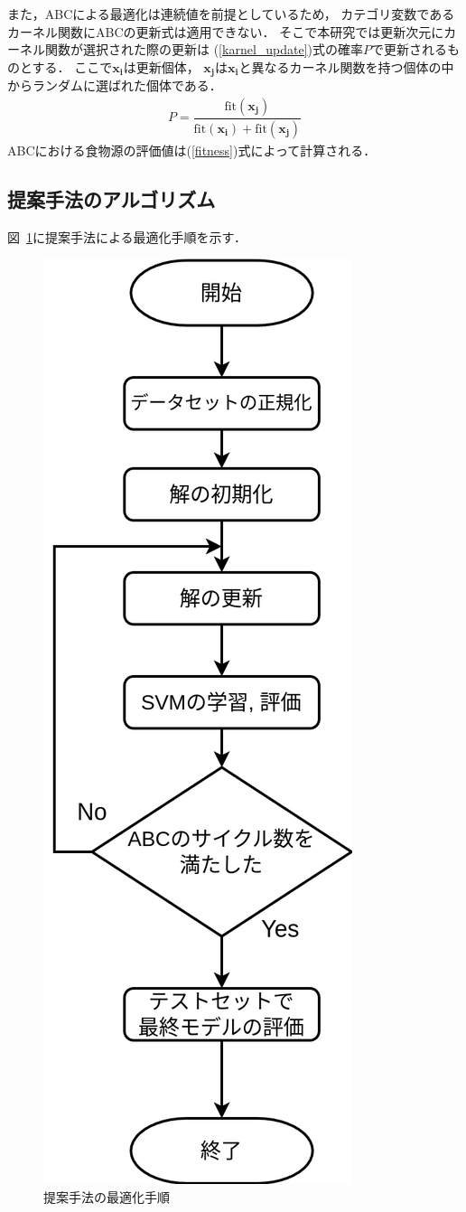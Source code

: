 また，ABCによる最適化は連続値を前提としているため，
カテゴリ変数であるカーネル関数にABCの更新式は適用できない．
そこで本研究では更新次元にカーネル関数が選択された際の更新は
(\ref{karnel_update})式の確率$P$で更新されるものとする．
ここで$\boldsymbol{x_i}$は更新個体，
$\boldsymbol{x_j}$は$\boldsymbol{x_i}$と異なるカーネル関数を持つ個体の中からランダムに選ばれた個体である．
\begin{align}
    \label{karnel_update}
   P = \dfrac{\mathrm{fit}(\boldsymbol{x_j})}{\mathrm{fit}(\boldsymbol{x_i})+\mathrm{fit}(\boldsymbol{x_j})}
\end{align}
ABCにおける食物源の評価値は(\ref{fitness})式によって計算される．
\subsection{提案手法のアルゴリズム}
図~\ref{flowchart}に提案手法による最適化手順を示す．
\begin{figure}
    \centering
    \includegraphics[width=0.4\linewidth]{flowchart.png}
    \caption{提案手法の最適化手順} 
    \label{flowchart}
\end{figure}
